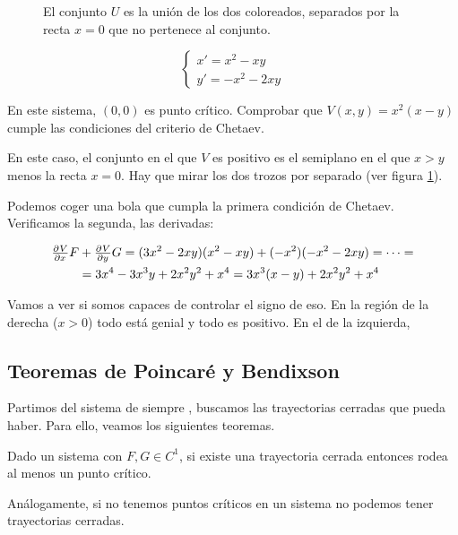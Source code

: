 \begin{example}

\begin{figure}
\label{img8-Ej6}
\caption{El conjunto $U$ es la unión de los dos coloreados, separados por la recta $x=0$ que no pertenece al conjunto.}
\end{figure}

\[ \begin{cases}
x' = x^2 - xy \\ y' = -x^2 -2xy
\end{cases}\]

En este sistema, $(0,0)$ es punto crítico. Comprobar que $V(x,y) = x^2(x-y)$ cumple las condiciones del criterio de Chetaev.

En este caso, el conjunto en el que $V$ es positivo es el semiplano en el que $x > y$ menos la recta $x=0$. Hay que mirar los dos trozos por separado (ver figura \ref{img8-Ej6}).

Podemos coger una bola que cumpla la primera condición de Chetaev. Verificamos la segunda, las derivadas:

\begin{multline*}
 \pd{V}{x} F + \pd{V}{y}G = (3x^2-2xy)(x^2-xy) + (-x^2)(-x^2-2xy) = \dotsb = \\ =  3x^4-3x^3y+2x^2y^2+x^4 = 3x^3(x-y) + 2x^2y^2+x^4 \end{multline*}

Vamos a ver si somos capaces de controlar el signo de eso. En la región de la derecha ($x>0$) todo está genial y todo es positivo. En el de la izquierda, 
\end{example}

\subsection{Teoremas de Poincaré y Bendixson}

Partimos del sistema de siempre , buscamos las trayectorias cerradas que pueda haber. Para ello, veamos los siguientes teoremas.

\begin{theorem}[de Poincaré] Dado un sistema  con $F,G∈C^1$, si existe una trayectoria cerrada entonces rodea al menos un punto crítico.

Análogamente, si no tenemos puntos críticos en un sistema no podemos tener trayectorias cerradas.
\end{theorem}


